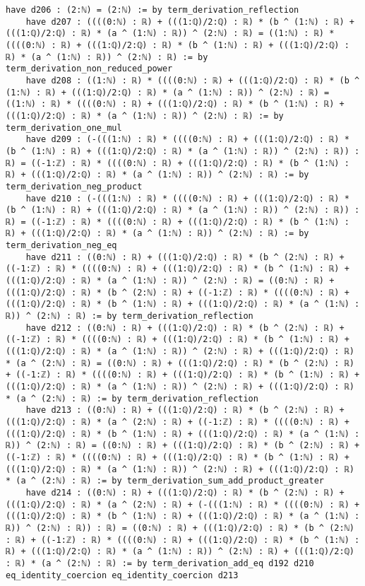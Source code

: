 \documentclass{article}
\begin{document}
\begin{tcolorbox}[colback=white!10, width=\linewidth]
\begin{lstlisting}[language=Lean4]
    have d206 : (2:ℕ) = (2:ℕ) := by term_derivation_reflection
    have d207 : ((((0:ℕ) : ℝ) + (((1:ℚ)/2:ℚ) : ℝ) * (b ^ (1:ℕ) : ℝ) + (((1:ℚ)/2:ℚ) : ℝ) * (a ^ (1:ℕ) : ℝ)) ^ (2:ℕ) : ℝ) = ((1:ℕ) : ℝ) * ((((0:ℕ) : ℝ) + (((1:ℚ)/2:ℚ) : ℝ) * (b ^ (1:ℕ) : ℝ) + (((1:ℚ)/2:ℚ) : ℝ) * (a ^ (1:ℕ) : ℝ)) ^ (2:ℕ) : ℝ) := by term_derivation_non_reduced_power
    have d208 : ((1:ℕ) : ℝ) * ((((0:ℕ) : ℝ) + (((1:ℚ)/2:ℚ) : ℝ) * (b ^ (1:ℕ) : ℝ) + (((1:ℚ)/2:ℚ) : ℝ) * (a ^ (1:ℕ) : ℝ)) ^ (2:ℕ) : ℝ) = ((1:ℕ) : ℝ) * ((((0:ℕ) : ℝ) + (((1:ℚ)/2:ℚ) : ℝ) * (b ^ (1:ℕ) : ℝ) + (((1:ℚ)/2:ℚ) : ℝ) * (a ^ (1:ℕ) : ℝ)) ^ (2:ℕ) : ℝ) := by term_derivation_one_mul
    have d209 : (-(((1:ℕ) : ℝ) * ((((0:ℕ) : ℝ) + (((1:ℚ)/2:ℚ) : ℝ) * (b ^ (1:ℕ) : ℝ) + (((1:ℚ)/2:ℚ) : ℝ) * (a ^ (1:ℕ) : ℝ)) ^ (2:ℕ) : ℝ)) : ℝ) = ((-1:ℤ) : ℝ) * ((((0:ℕ) : ℝ) + (((1:ℚ)/2:ℚ) : ℝ) * (b ^ (1:ℕ) : ℝ) + (((1:ℚ)/2:ℚ) : ℝ) * (a ^ (1:ℕ) : ℝ)) ^ (2:ℕ) : ℝ) := by term_derivation_neg_product
    have d210 : (-(((1:ℕ) : ℝ) * ((((0:ℕ) : ℝ) + (((1:ℚ)/2:ℚ) : ℝ) * (b ^ (1:ℕ) : ℝ) + (((1:ℚ)/2:ℚ) : ℝ) * (a ^ (1:ℕ) : ℝ)) ^ (2:ℕ) : ℝ)) : ℝ) = ((-1:ℤ) : ℝ) * ((((0:ℕ) : ℝ) + (((1:ℚ)/2:ℚ) : ℝ) * (b ^ (1:ℕ) : ℝ) + (((1:ℚ)/2:ℚ) : ℝ) * (a ^ (1:ℕ) : ℝ)) ^ (2:ℕ) : ℝ) := by term_derivation_neg_eq
    have d211 : ((0:ℕ) : ℝ) + (((1:ℚ)/2:ℚ) : ℝ) * (b ^ (2:ℕ) : ℝ) + ((-1:ℤ) : ℝ) * ((((0:ℕ) : ℝ) + (((1:ℚ)/2:ℚ) : ℝ) * (b ^ (1:ℕ) : ℝ) + (((1:ℚ)/2:ℚ) : ℝ) * (a ^ (1:ℕ) : ℝ)) ^ (2:ℕ) : ℝ) = ((0:ℕ) : ℝ) + (((1:ℚ)/2:ℚ) : ℝ) * (b ^ (2:ℕ) : ℝ) + ((-1:ℤ) : ℝ) * ((((0:ℕ) : ℝ) + (((1:ℚ)/2:ℚ) : ℝ) * (b ^ (1:ℕ) : ℝ) + (((1:ℚ)/2:ℚ) : ℝ) * (a ^ (1:ℕ) : ℝ)) ^ (2:ℕ) : ℝ) := by term_derivation_reflection
    have d212 : ((0:ℕ) : ℝ) + (((1:ℚ)/2:ℚ) : ℝ) * (b ^ (2:ℕ) : ℝ) + ((-1:ℤ) : ℝ) * ((((0:ℕ) : ℝ) + (((1:ℚ)/2:ℚ) : ℝ) * (b ^ (1:ℕ) : ℝ) + (((1:ℚ)/2:ℚ) : ℝ) * (a ^ (1:ℕ) : ℝ)) ^ (2:ℕ) : ℝ) + (((1:ℚ)/2:ℚ) : ℝ) * (a ^ (2:ℕ) : ℝ) = ((0:ℕ) : ℝ) + (((1:ℚ)/2:ℚ) : ℝ) * (b ^ (2:ℕ) : ℝ) + ((-1:ℤ) : ℝ) * ((((0:ℕ) : ℝ) + (((1:ℚ)/2:ℚ) : ℝ) * (b ^ (1:ℕ) : ℝ) + (((1:ℚ)/2:ℚ) : ℝ) * (a ^ (1:ℕ) : ℝ)) ^ (2:ℕ) : ℝ) + (((1:ℚ)/2:ℚ) : ℝ) * (a ^ (2:ℕ) : ℝ) := by term_derivation_reflection
    have d213 : ((0:ℕ) : ℝ) + (((1:ℚ)/2:ℚ) : ℝ) * (b ^ (2:ℕ) : ℝ) + (((1:ℚ)/2:ℚ) : ℝ) * (a ^ (2:ℕ) : ℝ) + ((-1:ℤ) : ℝ) * ((((0:ℕ) : ℝ) + (((1:ℚ)/2:ℚ) : ℝ) * (b ^ (1:ℕ) : ℝ) + (((1:ℚ)/2:ℚ) : ℝ) * (a ^ (1:ℕ) : ℝ)) ^ (2:ℕ) : ℝ) = ((0:ℕ) : ℝ) + (((1:ℚ)/2:ℚ) : ℝ) * (b ^ (2:ℕ) : ℝ) + ((-1:ℤ) : ℝ) * ((((0:ℕ) : ℝ) + (((1:ℚ)/2:ℚ) : ℝ) * (b ^ (1:ℕ) : ℝ) + (((1:ℚ)/2:ℚ) : ℝ) * (a ^ (1:ℕ) : ℝ)) ^ (2:ℕ) : ℝ) + (((1:ℚ)/2:ℚ) : ℝ) * (a ^ (2:ℕ) : ℝ) := by term_derivation_sum_add_product_greater
    have d214 : ((0:ℕ) : ℝ) + (((1:ℚ)/2:ℚ) : ℝ) * (b ^ (2:ℕ) : ℝ) + (((1:ℚ)/2:ℚ) : ℝ) * (a ^ (2:ℕ) : ℝ) + (-(((1:ℕ) : ℝ) * ((((0:ℕ) : ℝ) + (((1:ℚ)/2:ℚ) : ℝ) * (b ^ (1:ℕ) : ℝ) + (((1:ℚ)/2:ℚ) : ℝ) * (a ^ (1:ℕ) : ℝ)) ^ (2:ℕ) : ℝ)) : ℝ) = ((0:ℕ) : ℝ) + (((1:ℚ)/2:ℚ) : ℝ) * (b ^ (2:ℕ) : ℝ) + ((-1:ℤ) : ℝ) * ((((0:ℕ) : ℝ) + (((1:ℚ)/2:ℚ) : ℝ) * (b ^ (1:ℕ) : ℝ) + (((1:ℚ)/2:ℚ) : ℝ) * (a ^ (1:ℕ) : ℝ)) ^ (2:ℕ) : ℝ) + (((1:ℚ)/2:ℚ) : ℝ) * (a ^ (2:ℕ) : ℝ) := by term_derivation_add_eq d192 d210 eq_identity_coercion eq_identity_coercion d213

\end{lstlisting}
\end{tcolorbox}
\end{document}
